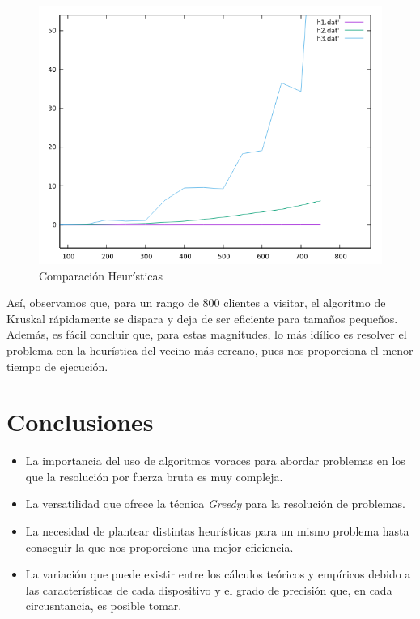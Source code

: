 \documentclass[a4paper,12pt,twoside]{article} %
\begin{document}
\begin{figure}[h]
  \begin{center}
  
  	\includegraphics[scale=0.7]{IMAGENES/comparativa_h.png}
  	\caption{Comparación Heurísticas}
  	
  \end{center}
\end{figure}

Así, observamos que, para un rango de 800 clientes a visitar, el algoritmo de Kruskal rápidamente se dispara y deja de ser eficiente para tamaños pequeños. Además, es fácil concluir que, para estas magnitudes, lo más idílico es resolver el problema con la heurística del vecino más cercano, pues nos proporciona el menor tiempo de ejecución.

\newpage

\section{Conclusiones} 

\begin{itemize}
	\item La importancia del uso de algoritmos voraces para abordar problemas en los que la resolución por fuerza bruta es muy compleja.
	\item La versatilidad que ofrece la técnica \textit{Greedy} para la resolución de problemas.
	\item La necesidad de plantear distintas heurísticas para un mismo problema hasta conseguir la que nos proporcione una mejor eficiencia.
	\item La variación que puede existir entre los cálculos teóricos y empíricos debido a las características de cada dispositivo y el grado de precisión que, en cada circusntancia, es posible tomar.
	

\end{itemize}
\end{document}
